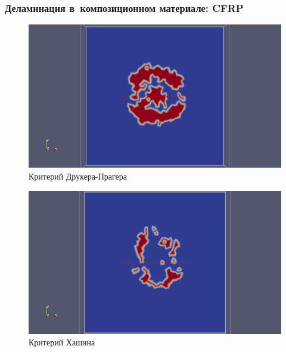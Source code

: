 \documentclass[xcolor={usenames,dvipsnames,svgnames,table}]{beamer}
\begin{document}
\begin{frame}
    \frametitle{Деламинация в~композиционном материале: CFRP}
    \vspace{-2.5em}
    \begin{center}
        \begin{minipage}[h]{0.33\textwidth}
            \begin{figure}[h]
                \includegraphics[width=\textwidth]{png/destruction/2lc-drpr-delam.png}
                \tiny
                \caption{Критерий Друкера-Прагера}
            \end{figure}
        \end{minipage}
        \begin{minipage}[h]{0.33\textwidth}
            \begin{figure}[h]
                \includegraphics[width=\textwidth]{png/destruction/2lc-hashin-delam.png}
                \tiny
                \caption{Критерий Хашина}
            \end{figure}
        \end{minipage}
        \begin{minipage}[h]{0.33\textwidth}

\end{minipage}
\end{center}
\end{frame}
\end{document}
